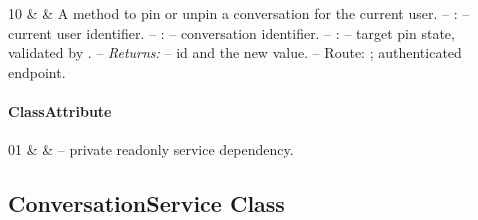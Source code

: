 \begin{ClassMethodTable}
10 & \newline{}\newline{} &
A method to pin or unpin a conversation for the current user.
\newline -- :  -- current user identifier.
\newline -- :  -- conversation identifier.
\newline -- :  -- target pin state, validated by .
\newline -- \textit{Returns:}  -- id and the new  value.
\newline -- Route: ; authenticated endpoint. \\ \hline
\end{ClassMethodTable}

\paragraph{ClassAttribute}
\begin{ClassAttributeTable}
01 &  &  -- private readonly service dependency. \\ \hline
\end{ClassAttributeTable}

\subsection{ConversationService Class}


